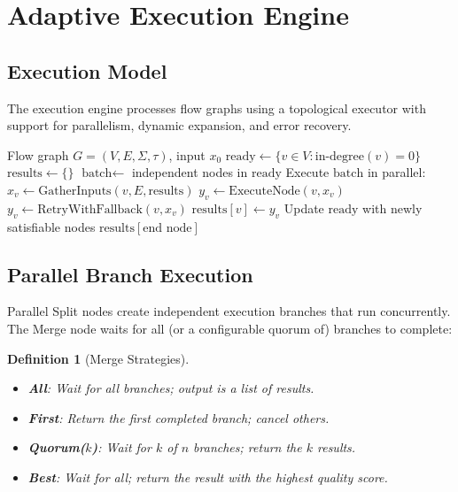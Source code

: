 \documentclass[11pt,twocolumn]{article}
\newtheorem{definition}{Definition}
\begin{document}
\section{Adaptive Execution Engine}
\label{sec:engine}

\subsection{Execution Model}

The execution engine processes flow graphs using a topological executor with support for parallelism, dynamic expansion, and error recovery.

\begin{algorithm}[H]
\caption{Adaptive Flow Execution}
\label{alg:execute}
\begin{algorithmic}[1]
\Require Flow graph $G = (V, E, \Sigma, \tau)$, input $x_0$
\State $\text{ready} \gets \{v \in V : \text{in-degree}(v) = 0\}$
\State $\text{results} \gets \{\}$
    \State $\text{batch} \gets$ independent nodes in $\text{ready}$
    \State Execute $\text{batch}$ in parallel:
        \State $x_v \gets \text{GatherInputs}(v, E, \text{results})$
        \State $y_v \gets \text{ExecuteNode}(v, x_v)$
            \State $y_v \gets \text{RetryWithFallback}(v, x_v)$
        \EndIf
        \State $\text{results}[v] \gets y_v$
    \EndFor
    \State Update $\text{ready}$ with newly satisfiable nodes
\EndWhile
\State \Return $\text{results}[\text{end node}]$
\end{algorithmic}
\end{algorithm}

\subsection{Parallel Branch Execution}

Parallel Split nodes create independent execution branches that run concurrently. The Merge node waits for all (or a configurable quorum of) branches to complete:

\begin{definition}[Merge Strategies]
\begin{itemize}[leftmargin=1.1em]
    \item \textbf{All}: Wait for all branches; output is a list of results.
    \item \textbf{First}: Return the first completed branch; cancel others.
    \item \textbf{Quorum($k$)}: Wait for $k$ of $n$ branches; return the $k$ results.
    \item \textbf{Best}: Wait for all; return the result with the highest quality score.
\end{itemize}
\end{definition}
\end{document}
